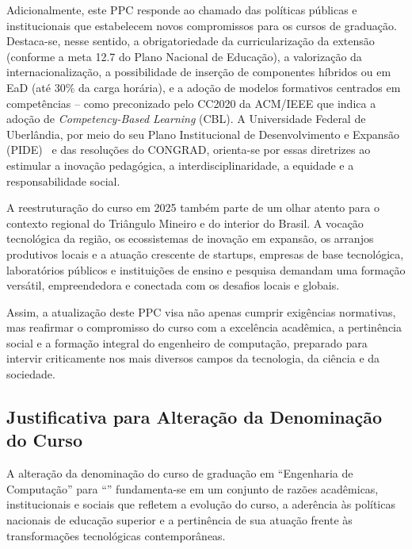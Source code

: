 Adicionalmente, este PPC responde ao chamado das políticas públicas e institucionais que estabelecem novos compromissos para os cursos de graduação. Destaca-se, nesse sentido, a obrigatoriedade da curricularização da extensão (conforme a meta 12.7 do Plano Nacional de Educação), a valorização da internacionalização, a possibilidade de inserção de componentes híbridos ou em EaD (até 30\% da carga horária), e a adoção de modelos formativos centrados em competências -- como preconizado pelo CC2020 da ACM/IEEE que indica a adoção de \textit{Competency-Based Learning} (CBL). A Universidade Federal de Uberlândia, por meio do seu Plano Institucional de Desenvolvimento e Expansão (PIDE)~\cite{UFU:CONSUN:31:2022} e das resoluções do CONGRAD, orienta-se por essas diretrizes ao estimular a inovação pedagógica, a interdisciplinaridade, a equidade e a responsabilidade social.

A reestruturação do curso em 2025 também parte de um olhar atento para o contexto regional do Triângulo Mineiro e do interior do Brasil. A vocação tecnológica da região, os ecossistemas de inovação em expansão, os arranjos produtivos locais e a atuação crescente de startups, empresas de base tecnológica, laboratórios públicos e instituições de ensino e pesquisa demandam uma formação versátil, empreendedora e conectada com os desafios locais e globais.

Assim, a atualização deste PPC visa não apenas cumprir exigências normativas, mas reafirmar o compromisso do curso com a excelência acadêmica, a pertinência social e a formação integral do engenheiro de computação, preparado para intervir criticamente nos mais diversos campos da tecnologia, da ciência e da sociedade.

\subsection{Justificativa para Alteração da Denominação do Curso}

A alteração da denominação do curso de graduação em ``Engenharia de Computação'' para ``\ppccurso'' fundamenta-se em um conjunto de razões acadêmicas, institucionais e sociais que refletem a evolução do curso, a aderência às políticas nacionais de educação superior e a pertinência de sua atuação frente às transformações tecnológicas contemporâneas.


